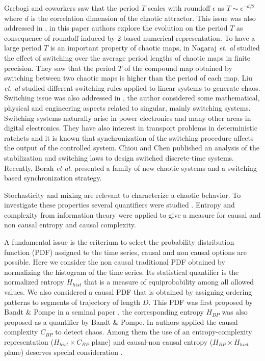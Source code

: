 Grebogi and coworkers \cite{Grebogi1988} saw that the period $T$ scales with roundoff $\epsilon$ as $T\sim\epsilon^{-d/2}$ where $d$ is the correlation dimension of the chaotic attractor.
This issue was also addressed in \cite{Persohn2012}, in this paper authors explore the evolution on the period $T$ as consequence of roundoff induced by 2-based numerical representation.
To have a large period $T$ is an important property of chaotic maps, in \cite{Nagaraj2008} Nagaraj \textit{et. al} studied the effect of switching over the average period lengths of chaotic maps in finite precision.
They saw that the period $T$ of the compound map obtained by switching between two chaotic maps is higher than the period of each map.
Liu \textit{et. al} \cite{Liu2006} studied different switching rules applied to linear systems to generate chaos.
Switching issue was also addressed in \cite{Gluskin2008}, the author considered some mathematical, physical and engineering aspects related to singular, mainly switching systems.
Switching systems naturally arise in power electronics and many other areas in digital electronics.
They have also interest in transport problems in deterministic ratchets \cite{Zarlenga2009} and it is known that synchronization of the switching procedure affects the output of the controlled system.
Chiou and Chen \cite{Chiou2009} published an analysis of the stabilization and switching laws to design switched discrete-time systems.
Recently, Borah \textit{et al.} \cite{Borah2017} presented a family of new chaotic systems and a switching based synchronization strategy.

Stochasticity and mixing are relevant to characterize a chaotic behavior.
To investigate these properties several quantifiers were studied \cite{DeMicco2009}.
Entropy and complexity from information theory were applied to give a measure for causal and non causal entropy and causal complexity.

A fundamental issue is the criterium to select the probability distribution function (PDF) assigned to the time series, causal and non causal options are possible.
Here we consider the non causal traditional PDF obtained by normalizing the histogram of the time series.
Its statistical quantifier is the normalized entropy $H_{hist}$ that is a measure of equiprobability among all allowed values.
We also considered a causal PDF that is obtained by assigning ordering patterns to segments of trajectory of length $D$.
This PDF was first proposed by Bandt \& Pompe in a seminal paper \cite{Bandt2002}, the corresponding entropy $H_{BP}$ was also proposed as a quantifier by Bandt \& Pompe.
In \cite{Rosso2007a} authors applied the causal complexity $C_{BP}$ to detect chaos.
Among them the use of an entropy-complexity representation ($H_{hist} \times C_{BP}$ plane) and causal-non causal entropy ($H_{BP} \times H_{hist}$ plane) deserves special consideration \cite{DeMicco2009,DeMicco2008,DeMicco2012,Rosso2007a,Rosso2010,Antonelli2017}.

